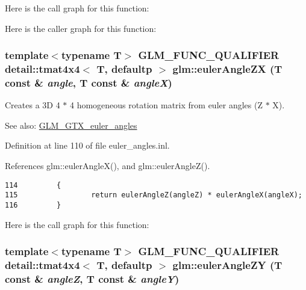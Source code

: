 Here is the call graph for this function:

Here is the caller graph for this function:\hypertarget{group__gtx__euler__angles_g3709f9eb45b49ecf41d42bec91c031fa}{
\subsubsection[eulerAngleZX]{\setlength{\rightskip}{0pt plus 5cm}template$<$typename T$>$ GLM\_\-FUNC\_\-QUALIFIER detail::tmat4x4$<$ T, defaultp $>$ glm::eulerAngleZX (T const \& {\em angle}, \/  T const \& {\em angleX})}}
\label{group__gtx__euler__angles_g3709f9eb45b49ecf41d42bec91c031fa}


Creates a 3D 4 $\ast$ 4 homogeneous rotation matrix from euler angles (Z $\ast$ X). \begin{Desc}
\item[See also:]\hyperlink{group__gtx__euler__angles}{GLM\_\-GTX\_\-euler\_\-angles} \end{Desc}


Definition at line 110 of file euler\_\-angles.inl.

References glm::eulerAngleX(), and glm::eulerAngleZ().

\begin{Code}\begin{verbatim}114         {
115                 return eulerAngleZ(angleZ) * eulerAngleX(angleX);
116         }
\end{verbatim}
\end{Code}




Here is the call graph for this function:\hypertarget{group__gtx__euler__angles_gfcd7d34bef520fd8bee6d4d865a8162a}{
\subsubsection[eulerAngleZY]{\setlength{\rightskip}{0pt plus 5cm}template$<$typename T$>$ GLM\_\-FUNC\_\-QUALIFIER detail::tmat4x4$<$ T, defaultp $>$ glm::eulerAngleZY (T const \& {\em angleZ}, \/  T const \& {\em angleY})}}
\label{group__gtx__euler__angles_gfcd7d34bef520fd8bee6d4d865a8162a}


